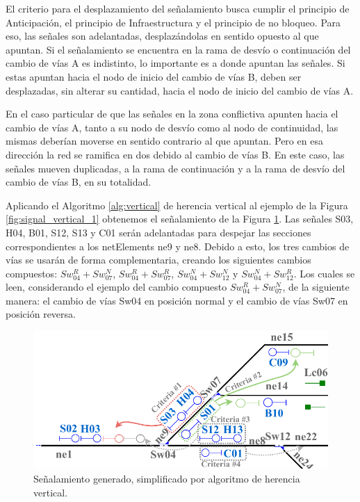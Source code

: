     El criterio para el desplazamiento del señalamiento busca cumplir el principio de Anticipación, el principio de Infraestructura y el principio de no bloqueo. Para eso, las señales son adelantadas, desplazándolas en sentido opuesto al que apuntan. Si el señalamiento se encuentra en la rama de desvío o continuación del cambio de vías A es indistinto, lo importante es a donde apuntan las señales. Si estas apuntan hacia el nodo de inicio del cambio de vías B, deben ser desplazadas, sin alterar su cantidad, hacia el nodo de inicio del cambio de vías A. 
    
    En el caso particular de que las señales en la zona conflictiva apunten hacia el cambio de vías A, tanto a su nodo de desvío como al nodo de continuidad, las mismas deberían moverse en sentido contrario al que apuntan. Pero en esa dirección la red se ramifica en dos debido al cambio de vías B. En este caso, las señales mueven duplicadas, a la rama de continuación y a la rama de desvío del cambio de vías B, en su totalidad.
    
    Aplicando el Algoritmo \ref{alg:vertical} de herencia vertical al ejemplo de la Figura \ref{fig:signal_vertical_1} obtenemos el señalamiento de la Figura \ref{fig:signal_vertical_2}. Las señales S03, H04, B01, S12, S13 y C01 serán adelantadas para despejar las secciones correspondientes a los netElements ne9 y ne8. Debido a esto, los tres cambios de vías se usarán de forma complementaria, creando los siguientes cambios compuestos: $Sw_{04}^R+Sw_{07}^N$, $Sw_{04}^R+Sw_{07}^R$, $Sw_{04}^N+Sw_{12}^N$ y $Sw_{04}^N+Sw_{12}^R$. Los cuales se leen, considerando el ejemplo del cambio compuesto $Sw_{04}^R+Sw_{07}^N$, de la siguiente manera: el cambio de vías Sw04 en posición normal y el cambio de vías Sw07 en posición reversa.
    
    \begin{figure}[h!]
    	\centering
    	\includegraphics[width=1\textwidth]{Figuras/Figure9_Crop.pdf}
    	\centering\caption{Señalamiento generado, simplificado por algoritmo de herencia vertical.}
    	\label{fig:signal_vertical_2}
    \end{figure}
    
